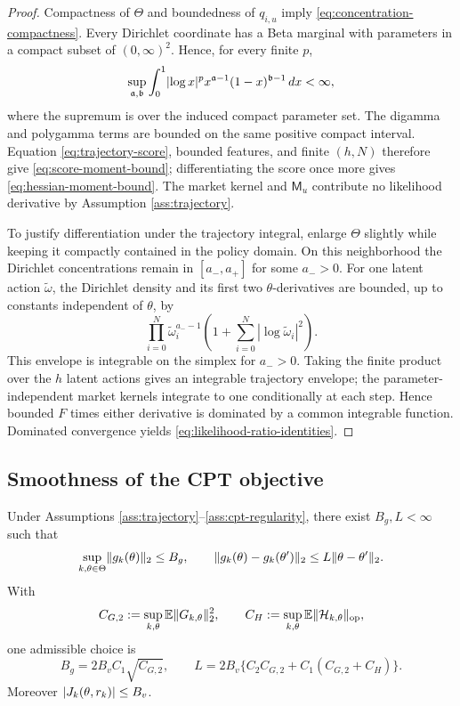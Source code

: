 \begin{proof}
Compactness of $\Theta$ and boundedness of $q_{i,u}$ imply \eqref{eq:concentration-compactness}.  Every Dirichlet coordinate has a Beta marginal with parameters in a compact subset of $(0,\infty)^2$.  Hence, for every finite $p$,
\[
 \sup_{\mathfrak a,\mathfrak b}\int_0^1
 \lvert\log x\rvert^p x^{\mathfrak a-1}(1-x)^{\mathfrak b-1}\,dx<\infty,
\]
where the supremum is over the induced compact parameter set.  The digamma and polygamma terms are bounded on the same positive compact interval.  Equation \eqref{eq:trajectory-score}, bounded features, and finite $(h,N)$ therefore give \eqref{eq:score-moment-bound}; differentiating the score once more gives \eqref{eq:hessian-moment-bound}.  The market kernel and $\mathsf M_u$ contribute no likelihood derivative by Assumption \ref{ass:trajectory}.

To justify differentiation under the trajectory integral, enlarge $\Theta$ slightly while keeping it compactly contained in the policy domain.  On this neighborhood the Dirichlet concentrations remain in $[a_-,a_+]$ for some $a_->0$.  For one latent action $\widetilde\omega$, the Dirichlet density and its first two $\theta$-derivatives are bounded, up to constants independent of $\theta$, by
\[
 \prod_{i=0}^{N}\widetilde\omega_i^{a_- -1}
 \left(1+\sum_{i=0}^{N}|\log\widetilde\omega_i|^2\right).
\]
This envelope is integrable on the simplex for $a_->0$.  Taking the finite product over the $h$ latent actions gives an integrable trajectory envelope; the parameter-independent market kernels integrate to one conditionally at each step.  Hence bounded $F$ times either derivative is dominated by a common integrable function.  Dominated convergence yields \eqref{eq:likelihood-ratio-identities}.
\end{proof}

\subsection{Smoothness of the CPT objective}

\begin{lemma}\label{lem:cpt-smoothness}
Under Assumptions \ref{ass:trajectory}--\ref{ass:cpt-regularity}, there exist $B_g,L<\infty$ such that
\begin{equation}\label{eq:uniform-gradient-smoothness}
 \sup_{k,\theta\in\Theta}\lVert g_k(\theta)\rVert_2\le B_g,
 \qquad
 \lVert g_k(\theta)-g_k(\theta')\rVert_2\le L\lVert\theta-\theta'\rVert_2.
\end{equation}
With
\[
 C_{G,2}:=\sup_{k,\theta}\mathbb E\lVert G_{k,\theta}\rVert_2^2,
 \qquad
 C_H:=\sup_{k,\theta}\mathbb E\lVert\mathcal H_{k,\theta}\rVert_{\mathrm{op}},
\]
one admissible choice is
\begin{equation}\label{eq:smoothness-constant}
 B_g=2B_vC_1\sqrt{C_{G,2}},
 \qquad
 L=2B_v\{C_2C_{G,2}+C_1(C_{G,2}+C_H)\}.
\end{equation}
Moreover $\lvert J_k(\theta,r_k)\rvert\le B_v$.
\end{lemma}

